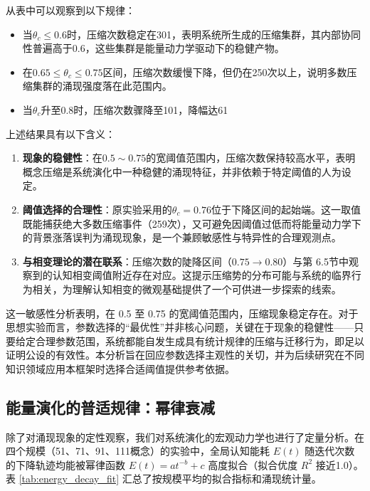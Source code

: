 \documentclass[12pt,a4paper]{article}
\begin{document}
从表中可以观察到以下规律：
\begin{itemize}
\item 当$\theta_c \leq 0.6$时，压缩次数稳定在301，表明系统所生成的压缩集群，其内部协同性普遍高于0.6，这些集群是能量动力学驱动下的稳健产物。
\item 在$0.65 \leq \theta_c \leq 0.75$区间，压缩次数缓慢下降，但仍在250次以上，说明多数压缩集群的涌现强度落在此范围内。
\item 当$\theta_c$升至0.8时，压缩次数骤降至101，降幅达61%
\end{itemize}

上述结果具有以下含义：
\begin{enumerate}
\item \textbf{现象的稳健性}：在$0.5 \sim 0.75$的宽阈值范围内，压缩次数保持较高水平，表明概念压缩是系统演化中一种稳健的涌现特征，并非依赖于特定阈值的人为设定。
\item \textbf{阈值选择的合理性}：原实验采用的$\theta_c = 0.76$位于下降区间的起始端。这一取值既能捕获绝大多数压缩事件（259次），又可避免因阈值过低而将能量动力学下的背景涨落误判为涌现现象，是一个兼顾敏感性与特异性的合理观测点。
\item \textbf{与相变理论的潜在联系}：压缩次数的陡降区间（$0.75 \to 0.80$）与第 6.5节中观察到的认知相变阈值附近存在对应。这提示压缩势的分布可能与系统的临界行为相关，为理解认知相变的微观基础提供了一个可供进一步探索的线索。
\end{enumerate}

这一敏感性分析表明，在 0.5 至 0.75 的宽阈值范围内，压缩现象稳定存在。对于思想实验而言，参数选择的“最优性”并非核心问题，关键在于现象的稳健性——只要给定合理参数范围，系统都能自发生成具有统计规律的压缩与迁移行为，即足以证明公设的有效性。本分析旨在回应参数选择主观性的关切，并为后续研究在不同知识领域应用本框架时选择合适阈值提供参考依据。

\subsection{能量演化的普适规律：幂律衰减}

除了对涌现现象的定性观察，我们对系统演化的宏观动力学也进行了定量分析。在四个规模（51、71、91、111概念）的实验中，全局认知能耗 $E(t)$ 随迭代次数的下降轨迹均能被幂律函数 $E(t) = a t^{-b} + c$ 高度拟合（拟合优度 $R^2$ 接近1.0）。表 \ref{tab:energy_decay_fit} 汇总了按规模平均的拟合指标和涌现统计量。
\end{document}

